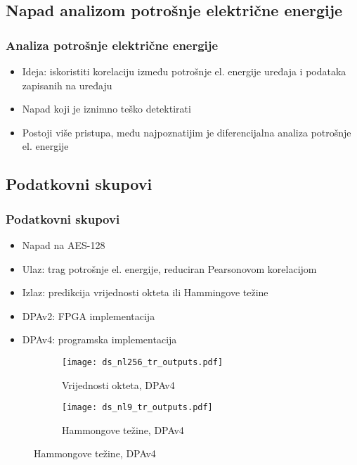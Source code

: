 \documentclass{beamer}
\begin{document}
\subsection{Napad analizom potrošnje električne energije} 

\begin{frame}
\frametitle{Analiza potrošnje električne energije}
\begin{itemize}
\item Ideja: iskoristiti korelaciju između potrošnje el. energije uređaja i podataka zapisanih na uređaju
\item Napad koji je iznimno teško detektirati
\item Postoji više pristupa, među najpoznatijim je diferencijalna analiza potrošnje el. energije
\end{itemize}

\end{frame}

\subsection{Podatkovni skupovi} 

\begin{frame}
\frametitle{Podatkovni skupovi}
\begin{itemize}
\item Napad na AES-128
\item Ulaz: trag potrošnje el. energije, reduciran Pearsonovom korelacijom
\item Izlaz: predikcija vrijednosti okteta ili Hammingove težine
\item DPAv2: FPGA implementacija
\item DPAv4: programska implementacija
\end{itemize}
\begin{figure}
\centering
\begin{subfigure}{.49\textwidth}
  \centering
  \texttt{[image: ds\_nl256\_tr\_outputs.pdf]}
  \caption{Vrijednosti okteta, DPAv4}
\end{subfigure}
\begin{subfigure}{.49\textwidth}
  \centering
  \texttt{[image: ds\_nl9\_tr\_outputs.pdf]}
  \caption{Hammongove težine, DPAv4}
\end{subfigure}
\end{figure}

\end{frame}
\end{document}
